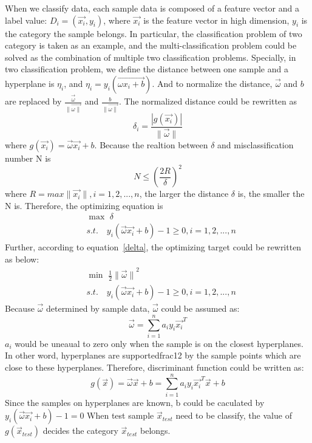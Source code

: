 \documentclass[runningheads,a4paper]{llncs}
\begin{document}
When we classify data, each sample data is composed of a feature vector and a
label value: $D_i = (\vec{x_i}, y_i)$, where $\vec{x_i}$ is the feature vector
in high dimension, $y_i$ is the category the sample belongs. In particular, the
classification problem of two category is taken as an example, and the multi-classification
problem could be solved as the combination of multiple two classification problems.
Specially, in two classification problem, we define the distance between one sample
and a hyperplane is $\eta_i$, and $\eta_i = y_i(\vec{\omega x_i + b})$. And to normalize the distance,
$\vec{\omega}$ and $b$ are replaced by $\frac{\vec{\omega}}{\|\vec{\omega\|}}$
and $\frac{b}{\|\vec{\omega\|}}$. The normalized distance could be rewritten
as
\begin{equation}
  \label{delta}
  \delta_i = \frac{|g(\vec{x_i})|}{\|\vec{\omega}\|}
\end{equation}
where $g(\vec{x_i})=\vec{\omega}\vec{x_i}+b$.
Because the realtion between $\delta$ and misclassification number N is
\begin{equation}
  N \leq {(\frac{2R}{\delta})}^2
\end{equation}
where $R=max\|\vec{x_i}\|, i=1,2,...,n$, the larger the distance $\delta$ is, the
smaller the N is. Therefore, the optimizing equation is
\begin{equation}
  \begin{split}
  &\max \,\, \delta\\
  &s.t.\quad y_i(\vec{\omega}\vec{x_i}+b)-1 \geq 0,i=1,2,...,n
 \end{split}
\end{equation}
Further, according to equation~\ref{delta}, the optimizing target could be
rewritten as below:
\begin{equation}
  \begin{split}
  &\min \,\, \frac{1}{2}{\|\vec{\omega}\|}^2\\
  &s.t.\quad y_i(\vec{\omega}\vec{x_i}+b)-1 \geq 0,i=1,2,...,n
 \end{split}
\end{equation}
Because $\vec{\omega}$ determined by sample data, $\vec{\omega}$ could be assumed as:
\begin{equation}
  \vec{\omega} = \sum_{i=1}^{n}a_iy_i\vec{x_i}^T
\end{equation}
$a_i$ would be uneaual to zero only when the sample is on the closest hyperplanes.
In other word, hyperplanes are supportedfrac{1}{2} by the sample points which are close to
these hyperplanes. Therefore, discriminant function could be written as:
\begin{equation}
  g(\vec{x}) = \vec{\omega}\vec{x}+b=\sum_{i=1}^{n}a_iy_i\vec{x_i}^T\vec{x}+b
\end{equation}
Since the samples on hyperplanes are known, b could be caculated by
$y_i(\vec{\omega}\vec{x_i}+b)-1=0$ When test sample $\vec{x}_{test}$
need to be classify, the value of $g(\vec{x}_{test})$
decides the category $\vec{x}_{test}$ belongs.
\end{document}
